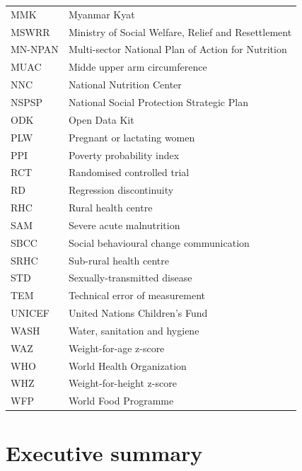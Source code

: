 \documentclass[12pt,a4paper]{article}
\begin{document}
\begin{table}[H]
\begin{tabular}{l>{\raggedright\arraybackslash}p{8cm}}
MMK & Myanmar Kyat\\
\rowcolor{gray!6}  MSWRR & Ministry of Social Welfare, Relief and Resettlement\\
MN-NPAN & Multi-sector National Plan of Action for Nutrition\\
\addlinespace
\rowcolor{gray!6}  MUAC & Midde upper arm circumference\\
NNC & National Nutrition Center\\
\rowcolor{gray!6}  NSPSP & National Social Protection Strategic Plan\\
ODK & Open Data Kit\\
\rowcolor{gray!6}  PLW & Pregnant or lactating women\\
\addlinespace
PPI & Poverty probability index\\
\rowcolor{gray!6}  RCT & Randomised controlled trial\\
RD & Regression discontinuity\\
\rowcolor{gray!6}  RHC & Rural health centre\\
SAM & Severe acute malnutrition\\
\addlinespace
\rowcolor{gray!6}  SBCC & Social behavioural change communication\\
SRHC & Sub-rural health centre\\
\rowcolor{gray!6}  STD & Sexually-transmitted disease\\
TEM & Technical error of measurement\\
\rowcolor{gray!6}  UNICEF & United Nations Children's Fund\\
\addlinespace
WASH & Water, sanitation and hygiene\\
\rowcolor{gray!6}  WAZ & Weight-for-age z-score\\
WHO & World Health Organization\\
\rowcolor{gray!6}  WHZ & Weight-for-height z-score\\
WFP & World Food Programme\\
\bottomrule
\end{tabular}
\end{table}

\newpage

\hypertarget{executive-summary}{%
\section*{Executive summary}\label{executive-summary}}
\end{document}
